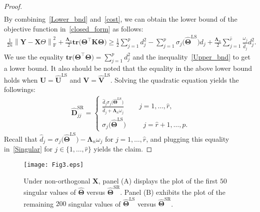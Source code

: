 \documentclass[12pt]{article}
\begin{document}
\begin{proof}
\begin{align}
\end{align}
By combining~\eqref{Lower_bnd} and~\eqref{cost}, we can obtain the lower bound of the objective function in~\eqref{closed_form} as follows:
\begin{align*}
    \frac{1}{2n} \left\| \boldsymbol{Y}-\boldsymbol{X}\Theta \right\|_{\text{F}}^{2} + \frac{\boldsymbol{\Lambda}_{n}}{2} 
    \textbf{tr}\big(\boldsymbol{\Theta}^{\top} \boldsymbol{K} \boldsymbol{\Theta} \big) \geq
    \frac{1}{2} \sum_{j=1}^{p} d_{j}^2 - \sum_{j=1}^{p} \sigma_{j}\big( \widehat{\boldsymbol{\Theta}}^{\text{LS}} \big)d_{j}  + \frac{\boldsymbol{\Lambda}_{n}}{2}\sum_{j=1}^{\widehat{r}} \frac{\omega_{j}}{\widehat{d}_{j}}d_{j}^2.
\end{align*}
We use the equality $\textbf{tr}\big(\boldsymbol{\Theta}^{\top}\boldsymbol{\Theta}\big)=\sum_{j=1}^{p}d_{j}^{2}$ and the inequality~\eqref{Upper_bnd} to get a lower bound.
It also should be noted that the equality in the above lower bound holds when $\boldsymbol{U}=\widehat{\boldsymbol{U}}^{\text{LS}}$ and $\boldsymbol{V}=\widehat{\boldsymbol{V}}^{\text{LS}}$.
Solving the quadratic equation yields the followings:
\begin{align} \label{Singular}
    &\widehat{\boldsymbol{D}}^{\text{SR}}_{jj} = 
    \begin{cases}
        \frac{\widehat{d}_{j}\sigma_{j}\big(\widehat{\boldsymbol{\Theta}}^{\text{LS}} \big) }{\widehat{d}_{j} + \boldsymbol{\Lambda}_{n}\omega_{j}} 
        \qquad \, j = 1,\dots,\widehat{r}, \\
        \sigma_{j}\big(\widehat{\boldsymbol{\Theta}}^{\text{LS}} \big) 
        \qquad \,\,\, j = \widehat{r}+1,\dots,p. 
    \end{cases}
\end{align}
Recall that $\widehat{d}_{j}=\sigma_{j}\big(\widehat{\boldsymbol{\Theta}}^{\text{LS}} \big)-\boldsymbol{\Lambda}_{n}\omega_{j}$ for $j=1,\dots,\widehat{r}$, 
and plugging this equality in~\eqref{Singular} for $j\in\{1,\dots,\widehat{r}\}$ yields the claim.
\end{proof}

\begin{figure}
  \hspace*{-1.4cm}                                                           
  \texttt{[image: Fig3.eps]}
  \centering
  \caption{ Under non-orthogonal $\boldsymbol{X}$, panel (A) displays the plot of the first $50$ singular values of $\boldsymbol{\widehat{\boldsymbol{\Theta}}}$ versus $\widehat{\boldsymbol{\Theta}}^{\text{SR}}$.
  Panel (B) exhibits the plot of the remaining $200$ singular values of $\widehat{\boldsymbol{\Theta}}^{\text{LS}}$ versus $\widehat{\boldsymbol{\Theta}}^{\text{SR}}$.}
  \label{Fig3}
\end{figure}
\end{document}
